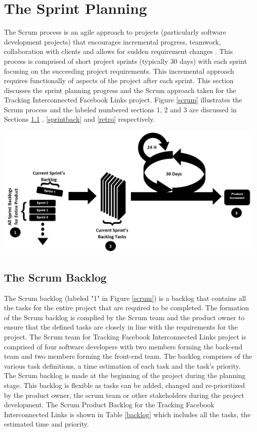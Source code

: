 \documentclass[12pt,onecolumn]{article}
\begin{document}
	\section{The Sprint Planning}
	The Scrum process is an agile approach to projects (particularly software development projects) that encourages incremental progress, teamwork, collaboration with clients and allows for sudden requirement changes \cite{Cohn}. This process is comprised of short project sprints (typically 30 days) with each sprint focusing on the succeeding project requirements. This incremental approach requires functionally of aspects of the project after each sprint. This section discusses the sprint planning progress and the Scrum approach taken for the Tracking Interconnected Facebook Links project. Figure \ref{scrum} illustrates the Scrum process and the labeled numbered sections 1, 2 and 3 are discussed in Sections  \ref{scrumback} ,  \ref{sprintback} and  \ref{retro} respectively.
	
\begin{center}
	\includegraphics[width=\textwidth]{scrum}
	 \label{fig:scrum}
\end{center}
		
		

	
	\subsection{The Scrum Backlog } \label{scrumback}
	The Scrum backlog (labeled "1" in Figure \ref{scrum}) is a backlog that contains all the tasks for the entire project that are required to be completed. The formation of the Scrum backlog is complied by the Scrum team and the product owner to ensure that the defined tasks are closely in line with the requirements for the project. The Scrum team for Tracking Facebook Interconnected Links project is comprised of four software developers with two members forming the back-end team and two members forming the front-end team. The backlog comprises of the various task definitions, a time estimation of each task and the task's priority. The Scrum backlog is made at the beginning of the project during the planning stage. This backlog is flexible as tasks can be added, changed and re-prioritized by the product owner, the scrum team or other stakeholders during the project development. The Scrum Product Backlog for the Tracking Facebook Interconnected Links is shown in Table \ref{backlog} which includes all the tasks, the estimated time and priority.     
	
\end{document}
